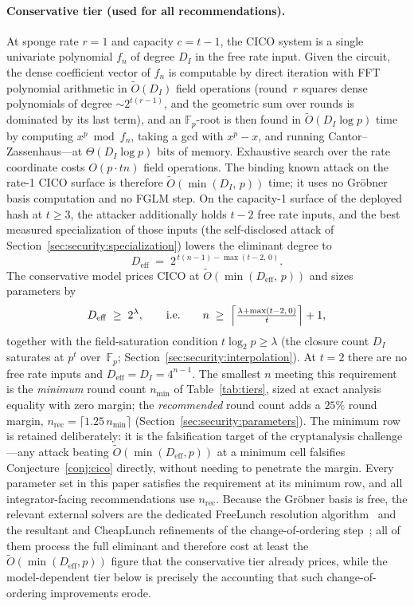 \documentclass[11pt,a4paper]{article}
\theoremstyle{definition}
\newcommand{\Fp}{\mathbb{F}_p}
\begin{document}
\paragraph{Conservative tier (used for all recommendations).}
At sponge rate $r=1$ and capacity $c = t-1$, the CICO system is a
single univariate polynomial $f_n$ of degree $D_I$ in the free rate
input. Given the circuit, the dense coefficient vector of $f_n$ is
computable by direct iteration with FFT polynomial arithmetic in
$\widetilde{O}(D_I)$ field operations (round~$r$ squares dense
polynomials of degree $\sim 2^{t(r-1)}$, and the geometric sum over
rounds is dominated by its last term), and an $\Fp$-root is then
found in $\widetilde{O}(D_I \log p)$ time by computing
$x^p \bmod f_n$, taking a gcd with $x^p - x$, and running
Cantor--Zassenhaus---at $\Theta(D_I \log p)$ bits of memory.
Exhaustive search over the rate coordinate costs $O(p \cdot tn)$
field operations. The binding known attack on the rate-1 CICO
surface is therefore $\widetilde{O}(\min(D_I,\, p))$ time; it uses no
Gr\"obner basis computation and no FGLM step. On the capacity-1
surface of the deployed hash at $t \ge 3$, the attacker additionally
holds $t-2$ free rate inputs, and the best measured specialization
of those inputs (the self-disclosed attack of
Section~\ref{sec:security:specialization}) lowers the eliminant
degree to
\[
  D_{\mathrm{eff}} \;=\; 2^{\,t(n-1) - \max(t-2,\,0)}.
\]
The conservative model prices CICO at
$\widetilde{O}(\min(D_{\mathrm{eff}},\, p))$ and sizes parameters by
\[
  D_{\mathrm{eff}} \;\ge\; 2^{\lambda},
  \qquad\text{i.e.}\qquad
  n \;\ge\; \Bigl\lceil \tfrac{\lambda + \max(t-2,\,0)}{t} \Bigr\rceil + 1,
\]
together with the field-saturation condition
$t \log_2 p \ge \lambda$ (the closure count $D_I$ saturates at $p^t$
over~$\Fp$; Section~\ref{sec:security:interpolation}). At $t = 2$
there are no free rate inputs and
$D_{\mathrm{eff}} = D_I = 4^{n-1}$. The smallest $n$ meeting this
requirement is the \emph{minimum} round count $n_{\min}$ of
Table~\ref{tab:tiers}, sized at exact analysis equality with zero
margin; the \emph{recommended} round count adds a $25\%$ round margin,
$n_{\mathrm{rec}} = \lceil 1.25\, n_{\min} \rceil$
(Section~\ref{sec:security:parameters}). The minimum row is retained
deliberately: it is the falsification target of the cryptanalysis
challenge---any attack beating
$\widetilde{O}(\min(D_{\mathrm{eff}}, p))$ at a minimum cell falsifies
Conjecture~\ref{conj:cico} directly, without needing to penetrate the
margin. Every parameter set in this paper satisfies the requirement
at its minimum row, and all integrator-facing recommendations use
$n_{\mathrm{rec}}$.
Because the Gr\"obner basis is free, the relevant external solvers
are the dedicated FreeLunch resolution algorithm~\cite{FreeLunch} and
the resultant and CheapLunch refinements of the change-of-ordering
step~\cite{Griffin_break,CheapLunch}; all of them process the full
eliminant and therefore cost at least the
$\widetilde{O}(\min(D_{\mathrm{eff}}, p))$ figure that the
conservative tier already prices, while the model-dependent tier
below is precisely the accounting that such change-of-ordering
improvements erode.
\end{document}
